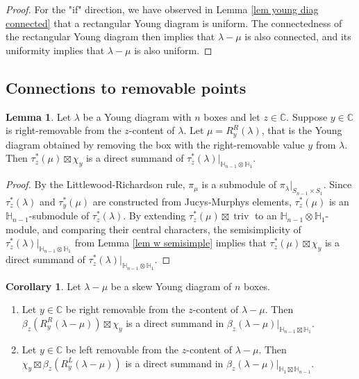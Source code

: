 \documentclass[11pt]{amsart}
\numberwithin{equation}{section}
\theoremstyle{definition}
\newtheorem{lemma}[thm]{Lemma}
\newtheorem{corollary}[thm]{Corollary}
\begin{document}
\begin{proof}
For the "if" direction, we have observed in Lemma \ref{lem young diag connected} that a rectangular Young diagram is uniform. The connectedness of the rectangular Young diagram then implies that $\lambda-\mu$ is also connected, and its uniformity implies that $\lambda-\mu$ is also uniform. 
\end{proof}


\subsection{Connections to removable points}


\begin{lemma}
Let $\lambda$ be a Young diagram with $n$ boxes and let $z \in \mathbb C$. Suppose $y \in \mathbb C$ is right-removable from the $z$-content of $\lambda$. Let $\mu=R^R_y(\lambda)$, that is the Young diagram obtained by removing the box with the right-removable value $y$ from $\lambda$. Then $\tau^*_z(\mu) \boxtimes \chi_y$ is a direct summand of $\tau^*_z(\lambda)|_{\mathbb H_{n-1}\otimes \mathbb H_1}$.
\end{lemma}

\begin{proof}
By the Littlewood-Richardson rule, $\pi_{\mu}$ is a submodule of $\pi_{\lambda}|_{S_{n-1}\times S_1}$. Since $\tau^*_z(\lambda)$ and $\tau^*_y(\mu)$ are constructed from Jucys-Murphys elements, $\tau^*_z(\mu)$ is an $\mathbb H_{n-1}$-submodule of $\tau^*_z(\lambda)$. By extending $\tau^*_z(\mu)\boxtimes\operatorname{triv}$ to an $\mathbb H_{n-1}\otimes \mathbb H_1$-module, and comparing their central characters, the semisimplicity of $\tau^*_z(\lambda)|_{\mathbb H_{n-1}\otimes \mathbb H_1}$ from  Lemma \ref{lem w semisimple} implies that $\tau^*_z(\mu)\boxtimes \chi_{y}$ is a direct summand of $\tau^*_z(\lambda)|_{\mathbb H_{n-1}\otimes \mathbb H_1}$.
\end{proof}


\begin{corollary} \label{cor removable restriction}
Let $\lambda-\mu$ be a skew Young diagram of $n$ boxes.
\begin{enumerate}
 \item Let $y \in \mathbb C$ be right removable from the $z$-content of $\lambda-\mu$. Then $\beta_z(R_y^R(\lambda-\mu))\boxtimes \chi_y$ is a direct summand in $\beta_z(\lambda-\mu)|_{\mathbb H_{n-1}\boxtimes \mathbb H_1}$.
\item Let $y \in \mathbb C$ be left removable from the $z$-content of $\lambda-\mu$. Then $\chi_y \boxtimes \beta_z(R^L_y(\lambda-\mu))$ is a direct summand in $\beta_z(\lambda-\mu)|_{\mathbb H_1\boxtimes \mathbb H_{n-1}}$.
\end{enumerate}
\end{corollary}
\end{document}
